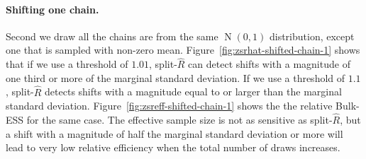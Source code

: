 \documentclass[american,]{article}
\let\oldparagraph\paragraph
\renewcommand{\paragraph}[1]{\oldparagraph{#1}\mbox{}}
\DeclareMathOperator{\N}{N}
\theoremstyle{definition}
\begin{document}
\hypertarget{shifting-one-chain}{%
\paragraph{Shifting one chain.}\label{shifting-one-chain}}
Second  we draw all the chains are from the same $\N(0, 1)$ distribution,
except one that is sampled with non-zero
mean. Figure~\ref{fig:zsrhat-shifted-chain-1} shows that if we use a
threshold of \(1.01\), split-\(\widehat{R}\) can detect shifts with a
magnitude of one third or more of the marginal standard deviation. If
we use a threshold of \(1.1\), split-\(\widehat{R}\) detects shifts
with a magnitude equal to or larger than the marginal standard
deviation.
%
Figure~\ref{fig:zsreff-shifted-chain-1} shows the the relative
Bulk-ESS for the same case. The effective
sample size is not as sensitive as split-\(\widehat{R}\), but a shift
with a magnitude of half the marginal standard deviation or more will
lead to very low relative efficiency when the total number of draws
increases.
\end{document}
